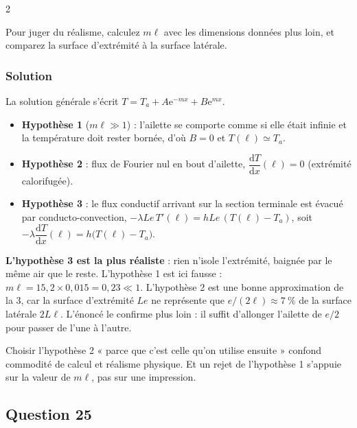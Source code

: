 \documentclass[11pt,a4paper]{article}
\providecommand{\tightlist}{\setlength{\itemsep}{0pt}\setlength{\parskip}{0pt}}
\begin{document}
\begin{indication}{2}

Pour juger du réalisme, calculez \(m\ell\) avec les dimensions données plus loin, et comparez la surface d'extrémité à la surface latérale.

\end{indication}

\hypertarget{solution-23}{%
\subsubsection{Solution}\label{solution-23}}

La solution générale s'écrit \(T=T_a+A{\mathrm{e}}^{-mx}+B{\mathrm{e}}^{mx}\).

\begin{itemize}
\tightlist
\item
  \textbf{Hypothèse 1} (\(m\ell\gg1\)) : l'ailette se comporte comme si elle était infinie et la température doit rester bornée, d'où \(B=0\) et \(\boxed{T(\ell)\simeq T_a}\).
\item
  \textbf{Hypothèse 2} : flux de Fourier nul en bout d'ailette, \(\boxed{\dfrac{\mathrm{d}T}{\mathrm{d}x}(\ell)=0}\) (extrémité calorifugée).
\item
  \textbf{Hypothèse 3} : le flux conductif arrivant sur la section terminale est évacué par conducto-convection, \(-\lambda Le\,T'(\ell)=hLe\,(T(\ell)-T_a)\), soit \(\boxed{-\lambda\dfrac{\mathrm{d}T}{\mathrm{d}x}(\ell)=h\big(T(\ell)-T_a\big)}\).
\end{itemize}

\textbf{L'hypothèse 3 est la plus réaliste} : rien n'isole l'extrémité, baignée par le même air que le reste. L'hypothèse 1 est ici fausse : \(m\ell=15{,}2\times0{,}015=0{,}23\ll1\). L'hypothèse 2 est une bonne approximation de la 3, car la surface d'extrémité \(Le\) ne représente que \(e/(2\ell)\approx7\ \%\) de la surface latérale \(2L\ell\). L'énoncé le confirme plus loin : il suffit d'allonger l'ailette de \(e/2\) pour passer de l'une à l'autre.

\begin{piege}

Choisir l'hypothèse 2 « parce que c'est celle qu'on utilise ensuite » confond commodité de calcul et réalisme physique. Et un rejet de l'hypothèse 1 s'appuie sur la valeur de \(m\ell\), pas sur une impression.

\end{piege}

\hypertarget{question-25}{%
\subsection{Question 25}\label{question-25}}
\end{document}
